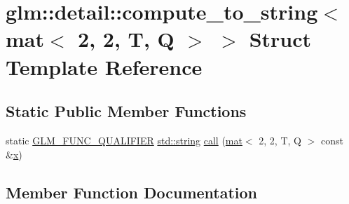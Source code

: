 \hypertarget{structglm_1_1detail_1_1compute__to__string_3_01mat_3_012_00_012_00_01_t_00_01_q_01_4_01_4}{}\section{glm\+:\+:detail\+:\+:compute\+\_\+to\+\_\+string$<$ mat$<$ 2, 2, T, Q $>$ $>$ Struct Template Reference}
\label{structglm_1_1detail_1_1compute__to__string_3_01mat_3_012_00_012_00_01_t_00_01_q_01_4_01_4}
\subsection*{Static Public Member Functions}
\begin{DoxyCompactItemize}
\item 
static \hyperlink{setup_8hpp_a33fdea6f91c5f834105f7415e2a64407}{G\+L\+M\+\_\+\+F\+U\+N\+C\+\_\+\+Q\+U\+A\+L\+I\+F\+I\+ER} \hyperlink{_s_d_l__opengl__glext_8h_ae84541b4f3d8e1ea24ec0f466a8c568b}{std\+::string} \hyperlink{structglm_1_1detail_1_1compute__to__string_3_01mat_3_012_00_012_00_01_t_00_01_q_01_4_01_4_a107a920bb722084d0518a0ff50e8c118}{call} (\hyperlink{structglm_1_1mat}{mat}$<$ 2, 2, T, Q $>$ const \&\hyperlink{_s_d_l__opengl_8h_ad0e63d0edcdbd3d79554076bf309fd47}{x})
\end{DoxyCompactItemize}


\subsection{Member Function Documentation}
\mbox{\label{structglm_1_1detail_1_1compute__to__string_3_01mat_3_012_00_012_00_01_t_00_01_q_01_4_01_4_a107a920bb722084d0518a0ff50e8c118}} 
